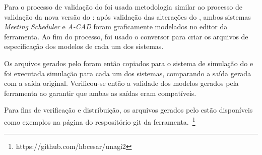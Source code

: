 Para o processo de validação do \unagi foi usada metodologia similar ao processo de validação da nova versão do \zanshin: após validação das alterações do \framework, ambos sistemas \textit{Meeting Scheduler} e \textit{A-CAD} foram graficamente modelados no editor da ferramenta. Ao fim do processo, foi usado o conversor para criar os arquivos \xml de especificação dos modelos de cada um dos sistemas. 

Os arquivos gerados pelo \unagi foram então copiados para o sistema de simulação do \zanshin e foi executada simulação para cada um dos sistemas, comparando a saída gerada com a saída original. Verificou-se então a validade dos modelos gerados pela ferramenta ao garantir que ambas as saídas eram compatíveis.

Para fins de verificação e distribuição, os arquivos gerados pelo \unagi estão disponíveis como exemplos na página do respositório git da ferramenta.~\footnote{https://github.com/hbcesar/unagi2}
